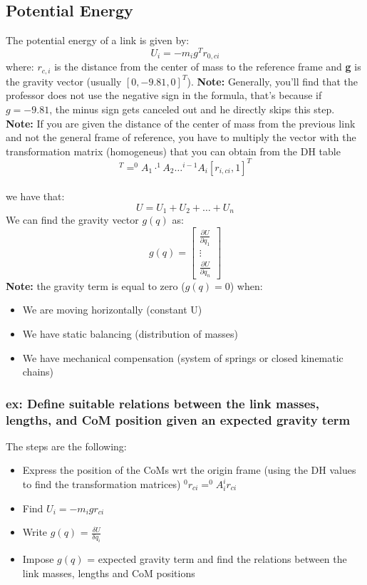 \documentclass[a4paper,12pt]{article}
\begin{document}
\subsection{Potential Energy} \label{sec:Potential Energy}
The potential energy of a link is given by:
\begin{equation}
    U_i = -m_i g^T r_{0,ci}
\end{equation}
where:
$r_{c,i}$ is the distance from the center of mass to the reference frame and \textbf{g} is 
the gravity vector (usually $[0,-9.81,0]^T$).\newline
\textbf{Note:} Generally, you'll find that the professor does not use the negative sign in the formula, that's because if $g = -9.81$, the minus sign gets canceled out and he directly skips this step.\newline
\textbf{Note:} If you are given the distance of the center of mass from the 
previous link and not the general frame of reference, you have to multiply the 
vector with the transformation matrix (homogeneus) that you can obtain from the DH table
\begin{equation}
    [r_{0,ci}, 1]^T=^0A_1 \cdot ^1A_2 \dots ^{i-1}A_i [r_{i,ci}, 1]^T
\end{equation}\\
we have that: \begin{equation}
    U= U_1+U_2+ \dots +U_n
\end{equation}
We can find the gravity vector $g(q)$ as:
\begin{equation}
    g(q) = \begin{bmatrix}
        \frac{\partial U}{\partial q_1} \\
        \vdots \\
        \frac{\partial U}{\partial q_n}
    \end{bmatrix}
\end{equation}
\textbf{Note:} the gravity term is equal to zero ($g(q)=0$) when:
\begin{itemize}
    \item We are moving horizontally (constant U)
    \item We have static balancing (distribution of masses)
    \item We have mechanical compensation (system of springs or closed kinematic chains)
\end{itemize}
    \subsubsection{ex: Define suitable relations between the link masses, lengths, and CoM position given an expected gravity term}
The steps are the following:
\begin{itemize}
    \item Express the position of the CoMs wrt the origin frame (using the DH values
    to find the transformation matrices) $^0r_{ci}=^0A_i ^ir_{ci}$
    \item Find $U_i = -m_i g r_{ci}$
    \item Write $g(q)$ = $\frac{\delta U}{\delta q_i}$
    \item Impose $g(q)$ = expected gravity term and find the 
    relations between the link masses, lengths and CoM positions
\end{itemize}
\end{document}
